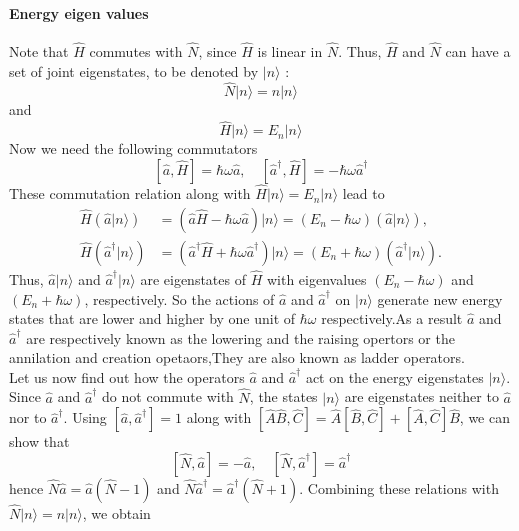   \paragraph{Energy eigen values}
   Note that $\hat{H}$  commutes with $\hat{N}$, since $\hat{H}$ is linear in $\hat{N}$. Thus, $\hat{H}$ and $\hat{N}$ can have a set of joint eigenstates, to be denoted by $|n\rangle$ :
   $$
   \hat{N}|n\rangle=n|n\rangle
   $$
   and
   $$
   \hat{H}|n\rangle=E_{n}|n\rangle
   $$
   Now we need the following commutators\\
$$[\hat{a}, \hat{H}]=\hbar \omega \hat{a}, \quad\left[\hat{a}^{\dagger}, \hat{H}\right]=-\hbar \omega \hat{a}^{\dagger}$$
These commutation relation along with  $\hat{H}|n\rangle=E_{n}|n\rangle$ lead to
$$\begin{aligned}
	\hat{H}(\hat{a}|n\rangle) &=(\hat{a} \hat{H}-\hbar \omega \hat{a})|n\rangle=\left(E_{n}-\hbar \omega\right)(\hat{a}|n\rangle), \\
	\hat{H}\left(\hat{a}^{\dagger}|n\rangle\right) &=\left(\hat{a}^{\dagger} \hat{H}+\hbar \omega \hat{a}^{\dagger}\right)|n\rangle=\left(E_{n}+\hbar \omega\right)\left(\hat{a}^{\dagger}|n\rangle\right) .
\end{aligned}$$
Thus, $\hat{a}|n\rangle$ and $\hat{a}^{\dagger}|n\rangle$ are eigenstates of $\hat{H}$ with eigenvalues $\left(E_{n}-\hbar \omega\right)$ and $\left(E_{n}+\hbar \omega\right)$, respectively. So the actions of $\hat{a}$ and $\hat{a}^{\dagger}$ on $|n\rangle$ generate new energy states that are lower and higher by one unit of $\hbar \omega$ respectively.As a result $\hat{a}$ and $\hat{a}^{\dagger}$ are respectively known as the lowering and the raising opertors or the annilation and creation opetaors,They are also known as ladder operators.\\
Let us now find out how the operators $\hat{a}$ and $\hat{a}^{\dagger}$ act on the energy eigenstates $|n\rangle$. Since $\hat{a}$ and $\hat{a}^{\dagger}$ do not commute with $\hat{N}$, the states $|n\rangle$ are eigenstates neither to $\hat{a}$ nor to $\hat{a}^{\dagger}$. Using $ \left[\hat{a}, \hat{a}^{\dagger}\right]=1$ along with $[\hat{A} \hat{B}, \hat{C}]=\hat{A}[\hat{B}, \hat{C}]+[\hat{A}, \hat{C}] \hat{B}$, we can show that\\
$$[\hat{N}, \hat{a}]=-\hat{a}, \quad\left[\hat{N}, \hat{a}^{\dagger}\right]=\hat{a}^{\dagger}$$
hence $\hat{N} \hat{a}=\hat{a}(\hat{N}-1)$ and $\hat{N} \hat{a}^{\dagger}=\hat{a}^{\dagger}(\hat{N}+1) .$ Combining these relations with $
\hat{N}|n\rangle=n|n\rangle
$, we obtain \\

